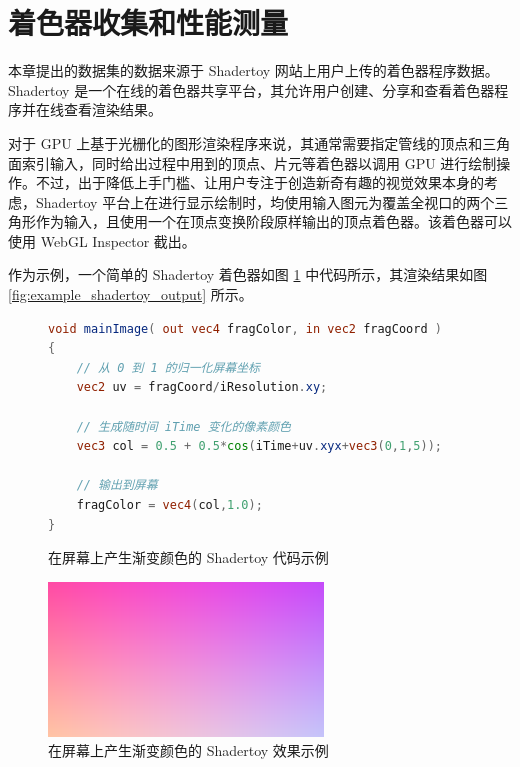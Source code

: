 \section{着色器收集和性能测量}

{\added 本章提出的数据集的数据来源于 Shadertoy\cite{Shadertoy} 网站上用户上传的着色器程序数据。} Shadertoy 是一个在线{\added 的着色器共享}平台，{\amend 其}允许用户创建、分享和查看着色器程序{\amend 并在线查看}渲染结果。

{\added 对于 GPU 上基于光栅化的图形渲染程序来说，其通常需要}指定管线的顶点和三角面索引输入，同时给出过程中用到的顶点、片元等着色器{\amend 以调用 GPU 进行绘制操作。}不过，出于降低上手门槛、让用户专注于创造新奇有趣的视觉效果本身的考虑，Shadertoy 平台上在进行显示绘制时，均{\amend 使用输入图元为覆盖全视口的两个三角形作为输入，且使用一个在顶点变换阶段原样输出的顶点着色器。}{\added 该着色器可以使用 WebGL Inspector \cite{WebGLInspector} 截出。}

作为示例，一个简单的 Shadertoy 着色器如图 \ref{fig:example_glsl_shadertoy_code_ch3} 中代码所示，其渲染结果如图 \ref{fig:example_shadertoy_output} 所示。

\begin{figure}  %
\centering

\begin{lstlisting}[language=GLSL]
void mainImage( out vec4 fragColor, in vec2 fragCoord )
{
    // 从 0 到 1 的归一化屏幕坐标
    vec2 uv = fragCoord/iResolution.xy;

    // 生成随时间 iTime 变化的像素颜色
    vec3 col = 0.5 + 0.5*cos(iTime+uv.xyx+vec3(0,1,5));

    // 输出到屏幕
    fragColor = vec4(col,1.0);
}
\end{lstlisting}
\caption{在屏幕上产生渐变颜色的 Shadertoy 代码示例}
\label{fig:example_glsl_shadertoy_code_ch3}
\end{figure}

\begin{figure}
  \centering
  \includegraphics[width=0.65\textwidth]{figures/example_shadertoy_output.png}
  \caption{在屏幕上产生渐变颜色的 Shadertoy 效果示例}
  \label{fig:example_shadertoy_output_ch3}
\end{figure}

